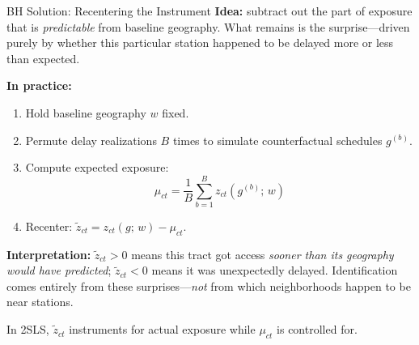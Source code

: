 \documentclass{beamer}
\begin{document}
\begin{frame}{BH Solution: Recentering the Instrument}
\small
\textbf{Idea:} subtract out the part of exposure that is \emph{predictable} from
baseline geography. What remains is the surprise---driven purely by whether this particular
station happened to be delayed more or less than expected.

\medskip
\textbf{In practice:}
\begin{enumerate}
    \item Hold baseline geography $w$ fixed.
    \item Permute delay realizations $B$ times to simulate counterfactual schedules $g^{(b)}$.
    \item Compute expected exposure:
    \[
        \mu_{ct} = \frac{1}{B}\sum_{b=1}^{B} z_{ct}(g^{(b)};\, w)
    \]
    \item Recenter: $\tilde{z}_{ct} = z_{ct}(g;\,w) - \mu_{ct}$.
\end{enumerate}

\medskip
\textbf{Interpretation:} $\tilde{z}_{ct} > 0$ means this tract got access \emph{sooner than
its geography would have predicted}; $\tilde{z}_{ct} < 0$ means it was unexpectedly delayed.
Identification comes entirely from these surprises---\emph{not} from which neighborhoods
happen to be near stations.

\medskip
In 2SLS, $\tilde{z}_{ct}$ instruments for actual exposure while $\mu_{ct}$ is controlled for.
\parencite{borusyak_nonrandom_2023}
\end{frame}
\end{document}
